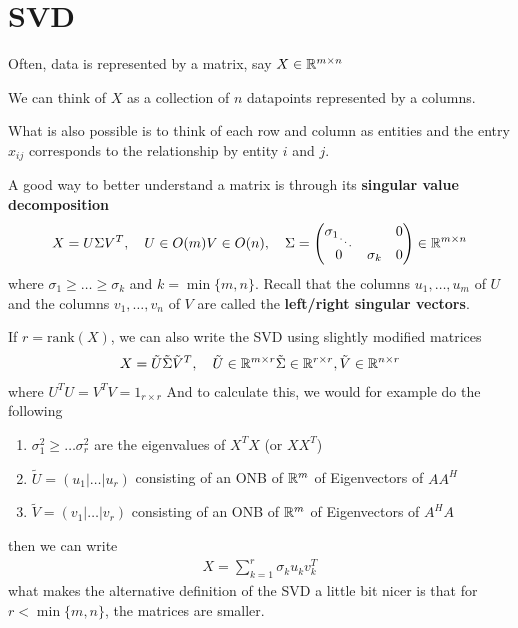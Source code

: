 \section{SVD}

Often, data is represented by a matrix, say $X \in \mathbb{R}^{m \times n}$

We can think of $X$ as a collection of $n$ datapoints represented by a columns.

What is also possible is to think of each row and column as entities and the entry $x_{ij}$ corresponds to the relationship by entity $i$ and $j$.

A good way to better understand a matrix is through its \textbf{singular value decomposition}
\begin{align*}
  X = U \Sigma V^{T}, \quad U \in O(m) V \in O(n), \quad \Sigma = \begin{pmatrix}
  {\sigma_1}_{\ddots} &  & 0\\
   0&  \sigma_k &0  \\
  \end{pmatrix}
  \in \mathbb{R}^{m\times n} 
\end{align*}
where $\sigma_1 \geq \ldots \geq \sigma_{k}$ and $k = \min\{m,n\}$.
Recall that the columns $u_{1}, \ldots, u_{m}$ of $U$ and the columns $v_{1}, \ldots, v_{n}$ of $V$ are called the \textbf{left/right singular vectors}.

If $r = \text{rank}(X)$, we can also write the SVD using slightly modified matrices
\begin{align*}
  X = \tilde{U} \tilde{\Sigma} \tilde{V}^{T}, \quad \tilde{U} \in \mathbb{R}^{m \times r} \tilde{\Sigma} \in \mathbb{R}^{r \times r}, \tilde{V} \in \mathbb{R}^{n \times r}
\end{align*}
where $U^{T}U = V^{T}V = 1_{r \times r}$
And to calculate this, we would for example do the following
\begin{enumerate}
  \item $\sigma_1^{2} \geq \ldots \sigma_r^{2}$ are the eigenvalues of $X^{T}X$ (or $XX^{T}$)
  \item $\tilde{U} = (u_1|\ldots|u_r)$ consisting of an ONB of $\mathbb{R}^{m}$ of Eigenvectors of $AA^{H}$
  \item $\tilde{V} = (v_1|\ldots|v_r)$ consisting of an ONB of $\mathbb{R}^{m}$ of Eigenvectors of $A^{H}A$
\end{enumerate}
then we can write
\begin{align*}
  X = \sum_{k = 1}^{r} \sigma_k u_k v_k^{T}
\end{align*}
what makes the alternative definition of the SVD a little bit nicer is that for $r < \min \{m,n\}$, the matrices are smaller.


